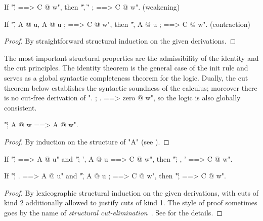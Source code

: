 \documentclass{article}
\begin{document}
\begin{thm} \mbox{}
  \begin{ecom}
  \item If "\G ; \D ==> C @ {w}", then "\G, \G' ; \D ==> C @ {w}". (weakening)
  \item If "\G, A @ u, A @ u ; \D ==> C @ {w}", then "\G, A @ u ; \D ==> C @ {w}". (contraction)
  \end{ecom}
\end{thm}

\begin{proof}
  By straightforward structural induction on the given derivations.
\end{proof}

The most important structural properties are the admissibility of the identity
and the cut principles. The identity theorem is the general case of the init
rule and serves as a global syntactic completeness theorem for the
logic. Dually, the cut theorem below establishes the syntactic soundness of the
calculus; moreover there is no cut-free derivation of ". ; . ==> zero @ w", so
the logic is also globally consistent.

\begin{thm}[identity] 
  "\G ; A @ w ==> A @ w".
\end{thm}

\begin{proof}
  By induction on the structure of "A" (see ).
\end{proof}

\bgroup
\begin{thm}[cut] \mbox{}
  \begin{ecom}[1.]
  \item If "\G ; \D ==> A @ u" and "\G ; \D', A @ u ==> C @ w", then "\G ; \D,
    \D' ==> C @ w".
  \item If "\G ; . ==> A @ u" and "\G, A @ u ; \D ==> C @ w", then "\G ; \D
    ==> C @ w".
  \end{ecom}
\end{thm}
\egroup

\begin{proof}
  By lexicographic structural induction on the given derivations, with cuts of
  kind 2 additionally allowed to justify cuts of kind 1. The style of proof
  sometimes goes by the name of \emph{structural
    cut-elimination}~\cite{chaudhuri03tr}.
  See  for the details.
\end{proof}
\end{document}
